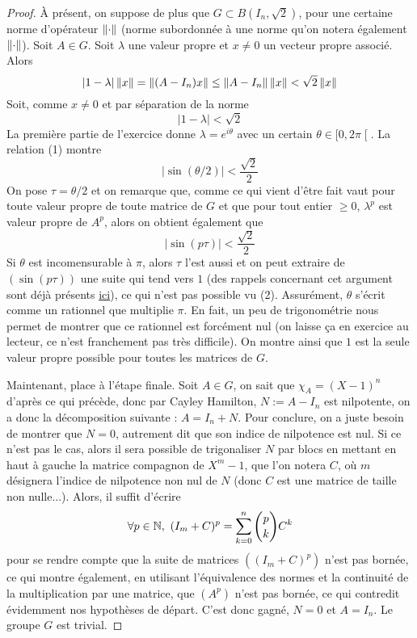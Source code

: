 \documentclass[10pt]{scrartcl}
\begin{document}
\begin{proof}
        À présent, on suppose de plus que $G\subset B(I_n,\sqrt2)$, pour une certaine 
        norme d'opérateur $\left\lVert \cdot\right\rVert$ (norme subordonnée à une norme qu'on notera 
        également $\left\lVert \cdot\right\rVert$). 
        Soit $A\in G$. 
        Soit $\lambda$ une valeur propre et $x\neq 0$ un vecteur propre associé. 
        Alors 
        \[
            |1-\lambda|\left\lVert x\right\rVert=\left\lVert (A-I_n)x\right\rVert\leq \left\lVert A-I_n\right\rVert\left\lVert x\right\rVert<\sqrt2\left\lVert x\right\rVert
        \]
        Soit, comme $x\neq 0$ et par séparation de la norme 
        \[
            |1-\lambda|<\sqrt2\tag*{(1)}
        \]
        La première partie de l'exercice donne $\lambda=e^{i\theta}$ avec 
        un certain $\theta\in\mathopen[0,2\pi\mathclose[$.
        La relation (1) montre 
        \[
            |\sin(\theta/2)|<\frac{\sqrt2}2
        \]
        On pose $\tau=\theta/2$ et on remarque que, comme ce qui vient d'être fait 
        vaut pour toute valeur propre de toute matrice de $G$ et que pour tout entier 
        $\geq 0$, $\lambda^p$ est valeur propre de $A^p$, alors on obtient également que 
        \[
            |\sin(p\tau)|<\frac{\sqrt2}2\tag*{(2)}
        \]
        Si $\theta$ est incomensurable à $\pi$, alors $\tau$ l'est aussi et  
        on peut extraire de $(\sin(p\tau))$ une suite qui tend vers $1$ (des rappels 
        concernant cet argument sont déjà présents \href{https://perso.eleves.ens-rennes.fr/people/amar.ahmane/src/colles/2024/s7/public_corr.pdf}{ici}), ce qui n'est pas possible vu (2).
        Assurément, $\theta$ s'écrit comme un rationnel que multiplie $\pi$. 
        En fait, un peu de trigonométrie nous permet de montrer que ce rationnel est 
        forcément nul (on laisse ça en exercice au lecteur, ce n'est franchement pas 
        très difficile). 
        On montre ainsi que $1$ est la seule valeur propre possible pour toutes les matrices
        de $G$.

        Maintenant, place à l'étape finale.
        Soit $A\in G$, on sait que $\chi_A=(X-1)^n$ d'après ce qui précède, donc par 
        Cayley Hamilton, $N:=A-I_n$ est nilpotente, on a donc la décomposition suivante :
        $A=I_n+N$.
        Pour conclure, on a juste besoin de montrer que $N=0$, autrement dit que son indice
        de nilpotence est nul. 
        Si ce n'est pas le cas, alors il sera possible de trigonaliser $N$ par blocs en 
        mettant en haut à gauche la matrice compagnon de $X^m-1$, que l'on notera $C$, où
        $m$ désignera l'indice de nilpotence non nul de $N$ (donc $C$ est une
        matrice de taille non nulle...). 
        Alors, il suffit d'écrire
        \[
            \forall p\in\operatorname{\mathbb N},\ (I_m+C)^p=\sum_{k=0}^n\binom pk C^k
        \]
        pour se rendre compte que la suite de matrices $((I_m+C)^p)$ n'est pas bornée, ce
        qui montre également, en utilisant l'équivalence des normes et la continuité de 
        la multiplication par une matrice, que $(A^p)$ n'est pas bornée, ce qui contredit 
        évidemment nos hypothèses de départ. 
        C'est donc gagné, $N=0$ et $A=I_n$. 
        Le groupe $G$ est trivial.
    \end{proof}
\end{document}
